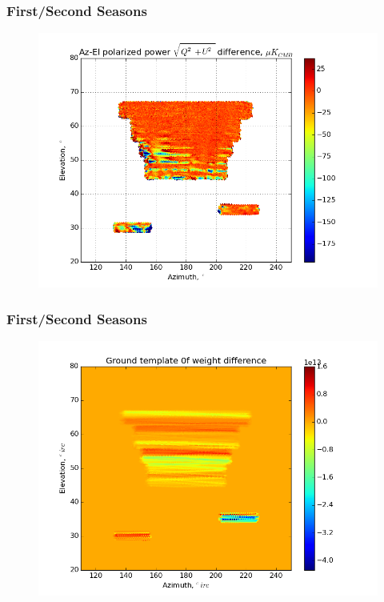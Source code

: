 \documentclass{beamer}
\begin{document}
\begin{frame}
\frametitle{First/Second Seasons}
\begin{figure}
\includegraphics[width=0.9\linewidth]{dMag_gt_FIRST_SECOND.png}
\end{figure}
\end{frame}

\begin{frame}
\frametitle{First/Second Seasons}
\begin{figure}
\includegraphics[width=0.9\linewidth]{dw0_gt_FIRST_SECOND.png}
\end{figure}
\end{frame}
\end{document}
